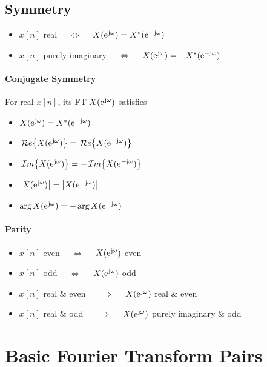 \documentclass[10pt,UTF8]{article}
\newenvironment{definition box}
{\begin{tcolorbox}[colback=blue!5!white,colframe=blue!75!black,parbox=false,before upper=\par,before lower=\par]}
{\end{tcolorbox}}
\newenvironment{theorem box}
{\begin{tcolorbox}[colback=yellow!5!white,colframe=yellow!75!black,parbox=false,before upper=\par,before lower=\par]}
{\end{tcolorbox}}
\theoremstyle{definition}
\newtheorem{definition inner}{Definition}[section]
\theoremstyle{plain}
\newtheorem{theorem inner}{Theorem}[section]
\theoremstyle{definition}
\newtheorem*{proof inner}{\textit{Proof}}
\theoremstyle{remark}
\newcommand{\ju}{\mathrm{j}}  %
\newcommand{\e}{\mathrm{e}{\mkern 1 mu}}
\renewcommand{\Re}{\,\mathcal{R}\ensuremath{e}\qty}
\renewcommand{\Im}{\,\mathcal{I}\ensuremath{m}\qty}
\begin{document}
\subsection{Symmetry}

\begin{itemize}
    \item $x[n]$ real $\quad\iff\quad$ $X(\e^{\ju\omega})=X^\ast(\e^{-\ju\omega})$
    \item $x[n]$ purely imaginary $\quad\iff\quad$ $X(\e^{\ju\omega})=-X^\ast(\e^{-\ju\omega})$
\end{itemize}

\paragraph{Conjugate Symmetry}
For real $x[n]$, its FT $X(\e^{\ju\omega})$ satisfies
\begin{itemize}
    \item $X(\e^{\ju\omega}) = X^\ast(\e^{-\ju\omega})$
    \item $\Re{X(\e^{\ju\omega})} = \Re{X(\e^{-\ju\omega})}$
    \item $\Im{X(\e^{\ju\omega})} = -\Im{X(\e^{-\ju\omega})}$
    \item $\abs{X(\e^{\ju\omega})} = \abs{X(\e^{-\ju\omega})}$
    \item $\arg X(\e^{\ju\omega}) = -\arg X(\e^{-\ju\omega})$
\end{itemize}

\paragraph{Parity}
\begin{itemize}
    \item $x[n]$ even $\quad\iff\quad$ $X(\e^{\ju\omega})$ even
    \item $x[n]$ odd $\quad\iff\quad$ $X(\e^{\ju\omega})$ odd
    \item $x[n]$ real \& even $\quad\implies\quad$
        $X(\e^{\ju\omega})$ real \& even
    \item $x[n]$ real \& odd $\quad\implies\quad$
        $X(\e^{\ju\omega})$ purely imaginary \& odd
\end{itemize}



\section{Basic Fourier Transform Pairs}
\end{document}
